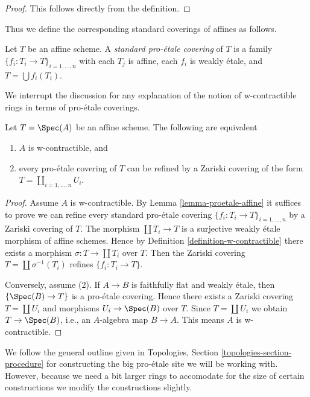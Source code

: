 \begin{proof}
This follows directly from the definition.
\end{proof}

\noindent
Thus we define the corresponding standard coverings of affines as follows.

\begin{definition}
\label{definition-standard-proetale}
Let $T$ be an affine scheme. A {\it standard pro-\'etale covering}
of $T$ is a family $\{f_i : T_i \to T\}_{i = 1, \ldots, n}$
with each $T_j$ is affine, each $f_i$ is weakly \'etale, and
$T = \bigcup f_i(T_i)$.
\end{definition}

\noindent
We interrupt the discussion for any explanation of the notion
of w-contractible rings in terms of pro-\'etale coverings.

\begin{lemma}
\label{lemma-w-contractible-proetale-cover}
Let $T = \Spec(A)$ be an affine scheme. The following are equivalent
\begin{enumerate}
\item $A$ is w-contractible, and
\item every pro-\'etale covering of $T$ can be refined by
a Zariski covering of the form $T = \coprod_{i = 1, \ldots, n} U_i$.
\end{enumerate}
\end{lemma}

\begin{proof}
Assume $A$ is w-contractible. By Lemma \ref{lemma-proetale-affine}
it suffices to prove we can refine every standard pro-\'etale covering
$\{f_i : T_i \to T\}_{i = 1, \ldots, n}$ by a Zariski covering of $T$.
The morphism $\coprod T_i \to T$ is a surjective weakly \'etale morphism
of affine schemes. Hence by Definition \ref{definition-w-contractible}
there exists a morphism $\sigma : T \to \coprod T_i$ over $T$.
Then the Zariski covering $T = \coprod \sigma^{-1}(T_i)$
refines $\{f_i : T_i \to T\}$.

\medskip\noindent
Conversely, assume (2). If $A \to B$ is faithfully flat and weakly \'etale,
then $\{\Spec(B) \to T\}$ is a pro-\'etale covering.
Hence there exists a Zariski covering $T = \coprod U_i$
and morphisms $U_i \to \Spec(B)$ over $T$. Since $T = \coprod U_i$
we obtain $T \to \Spec(B)$, i.e., an $A$-algebra map $B \to A$.
This means $A$ is w-contractible.
\end{proof}

\noindent
We follow the general outline given in
Topologies, Section \ref{topologies-section-procedure}
for constructing the big pro-\'etale site we will be working with.
However, because we need a bit larger rings to accomodate for the size
of certain constructions we modify the constructions slightly.

